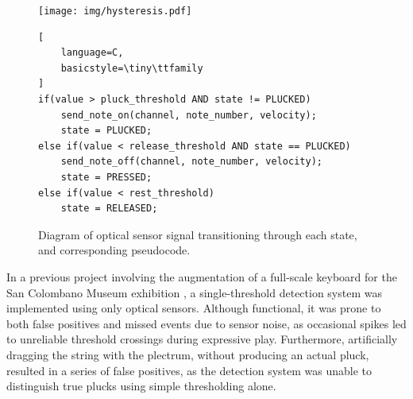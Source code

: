 \begin{figure}
    \centering
    \texttt{[image: img/hysteresis.pdf]}
    \label{fig:hysteresis}
\begin{lstlisting}[
    language=C,
    basicstyle=\tiny\ttfamily
] 
if(value > pluck_threshold AND state != PLUCKED)
    send_note_on(channel, note_number, velocity); 
    state = PLUCKED;
else if(value < release_threshold AND state == PLUCKED)
    send_note_off(channel, note_number, velocity); 
    state = PRESSED;
else if(value < rest_threshold)
    state = RELEASED;
\end{lstlisting}
  \caption{Diagram of optical sensor signal transitioning through each state, and corresponding pseudocode.}\label{fig:hystrss}
\end{figure}



In a previous project involving the augmentation of a full-scale keyboard for the San Colombano Museum exhibition \cite{hamilton2025augmentation}, a single-threshold detection system was implemented using only optical sensors. Although functional, it was prone to both false positives and missed events due to sensor noise, as occasional spikes led to unreliable threshold crossings during expressive play. Furthermore, artificially dragging the string with the plectrum, without producing an actual pluck, resulted in a series of false positives, as the detection system was unable to distinguish true plucks using simple thresholding alone. 

